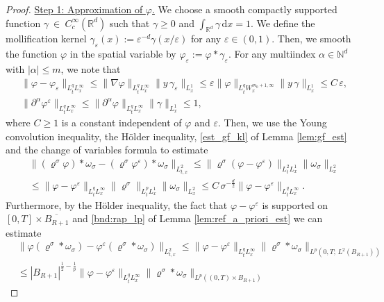 \documentclass[reqno, 11pt]{amsart}
\numberwithin{equation}{section}
\theoremstyle{definition}
\begin{document}
\begin{proof}
    \underline{Step 1: Approximation of $\varphi$.} We choose a smooth compactly supported function $\gamma~\in~C_c^\infty(\mathbb{R}^{d})$ such that $\gamma\geq 0$ and $\int_{\mathbb{R}^{d}}\gamma\,\mathrm{d} x=1$. We define the mollification kernel $\gamma_\varepsilon(x):=\varepsilon^{-d}\gamma(x/\varepsilon)$ for any $\varepsilon\in (0,1)$. Then, we smooth the function $\varphi$ in the spatial variable by $\varphi_\varepsilon:=\varphi\ast\gamma_\varepsilon$. For any multiindex $\alpha\in \mathbb{N}^d$ with $|\alpha|\leq m$, we note that
    \begin{align}
        \label{eq:approx_vp_D0}
        &\|\varphi- \varphi_\varepsilon\|_{L_t^q L_x^\infty}
        \leq \|\nabla \varphi\|_{L_t^q L_x^{\infty}}\|y\,\gamma_\varepsilon\|_{L_x^1}\leq \varepsilon\| \varphi\|_{L_t^q W_x^{m_0+1,\infty}}\|y\,\gamma\|_{L_x^1}
        \leq C\,\varepsilon,\\
        \label{eq:approx_vp_bnd}
        &\|\partial^\alpha \varphi^\varepsilon\|_{L_t^q L_x^\infty}\leq
        \|\partial^\alpha \varphi\|_{L_t^q L_x^\infty}\|\gamma\|_{L_x^1}
        \leq 1,
    \end{align}
    where $C\geq 1$ is a constant independent of $\varphi$ and $\varepsilon$. Then, we use the Young convolution inequality, the H\"older inequality, \ref{est_gf_kl} of Lemma \ref{lem:gf_est} and the change of variables formula to estimate
    \begin{align*}
        &\|(\varrho^\sigma\varphi)\ast\omega_\sigma-(\varrho^\sigma\varphi^\varepsilon)\ast\omega_\sigma\|_{L_{t,x}^2}
        \leq \|\varrho^\sigma(\varphi-\varphi^\varepsilon)\|_{L_t^2 L_x^1}\|\omega_\sigma\|_{L^2_x}\\
        &\leq \|\varphi-\varphi^\varepsilon\|_{L_t^q L_x^\infty}\|\varrho^\sigma\|_{L_t^p L_x^1}\|\omega_\sigma\|_{L^2_x}
        \leq C\,\sigma^{-\frac{d}{2}}\|\varphi-\varphi^\varepsilon\|_{L_t^q L_x^\infty}.
    \end{align*}
    Furthermore, by the H\"older inequality, the fact that $\varphi-\varphi^\varepsilon$ is supported on $[0,T]\times \overline{B_{R+1}}$ and \ref{bnd:rap_lp} of Lemma \ref{lem:ref_a_priori_est} we can estimate
    \begin{align*}
        &\|\varphi(\varrho^\sigma\ast\omega_\sigma)-\varphi^\varepsilon(\varrho^\sigma\ast\omega_\sigma)\|_{L_{t,x}^2}
        \leq \|\varphi-\varphi^\varepsilon\|_{L_t^q L_x^\infty}\|\varrho^\sigma\ast\omega_\sigma\|_{L^p(0,T;\,L^2(B_{R+1}))}\\
        &\leq |B_{R+1}|^{\frac{1}{2}- \frac{1}{p}}\|\varphi-\varphi^\varepsilon\|_{L_t^q L_x^\infty}\|\varrho^\sigma\ast\omega_\sigma\|_{L^p((0,T)\times B_{R+1})}

\end{align*}
\end{proof}
\end{document}
